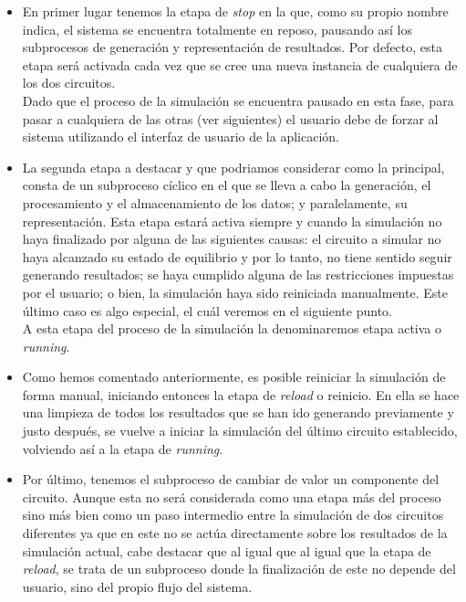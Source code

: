 \documentclass[../main.tex]{subfiles}
\begin{document}
\begin{itemize}
    \item En primer lugar tenemos la etapa de \textit{stop} en la que, como su propio nombre indica, el sistema se encuentra totalmente en reposo, pausando así los subprocesos de generación y representación de resultados. Por defecto, esta etapa será activada cada vez que se cree una nueva instancia de cualquiera de los dos circuitos. \\

    Dado que el proceso de la simulación se encuentra pausado en esta fase, para pasar a cualquiera de las otras (ver siguientes) el usuario debe de forzar al sistema utilizando el interfaz de usuario de la aplicación.

    \item La segunda etapa a destacar y que podriamos considerar como la principal, consta de un subproceso cíclico en el que se lleva a cabo la generación, el procesamiento y el almacenamiento de los datos; y paralelamente, su representación. Esta etapa estará activa siempre y cuando la simulación no haya finalizado por alguna de las siguientes causas: el circuito a simular no haya alcanzado su estado de equilibrio y por lo tanto, no tiene sentido seguir generando resultados; se haya cumplido alguna de las restricciones impuestas por el usuario; o bien, la simulación haya sido reiniciada manualmente. Este último caso es algo especial, el cuál veremos en el siguiente punto. \\

    A esta etapa del proceso de la simulación la denominaremos etapa activa o \textit{running}.

    \item Como hemos comentado anteriormente, es posible reiniciar la simulación de forma manual, iniciando entonces la etapa de \textit{reload} o reinicio. En ella se hace una limpieza de todos los resultados que se han ido generando previamente y justo después, se vuelve a iniciar la simulación del último circuito establecido, volviendo así a la etapa de \textit{running}. 

    \item Por último, tenemos el subproceso de cambiar de valor un componente del circuito. Aunque esta no será considerada como una etapa más del proceso sino más bien como un paso intermedio entre la  
    simulación de dos circuitos diferentes ya que en este no se actúa directamente sobre los resultados de la simulación actual, cabe destacar que al igual que al igual que la etapa de \textit{reload}, se trata de un subproceso donde la finalización de este no depende del usuario, sino del propio flujo del sistema. 
    
   
\end{itemize}
\end{document}
